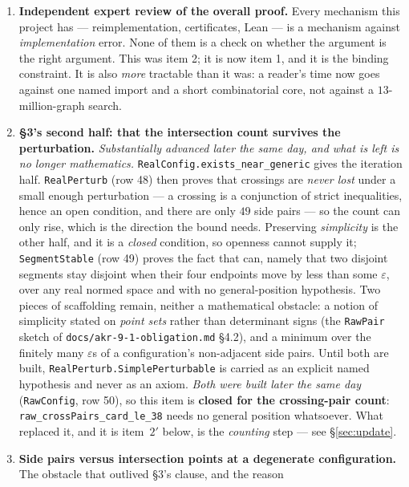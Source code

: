 \documentclass[11pt,a4paper]{article}
\theoremstyle{plain}
\theoremstyle{definition}
\theoremstyle{remark}
\begin{document}
\begin{enumerate}[leftmargin=*]
  \item \textbf{Independent expert review of the overall proof.} Every
    mechanism this project has --- reimplementation, certificates, Lean --- is a
    mechanism against \emph{implementation} error. None of them is a check on
    whether the argument is the right argument. This was item 2; it is now item
    1, and it is the binding constraint. It is also \emph{more} tractable than
    it was: a reader's time now goes against one named import and a short
    combinatorial core, not against a $13$-million-graph search.
  \item \textbf{\S3's second half: that the intersection count survives the
    perturbation.} \emph{Substantially advanced later the same day, and what is
    left is no longer mathematics.} \texttt{RealConfig.exists\_near\_generic}
    gives the iteration half. \texttt{RealPerturb} (row 48) then proves that
    crossings are \emph{never lost} under a small enough perturbation --- a
    crossing is a conjunction of strict inequalities, hence an open condition,
    and there are only $49$ side pairs --- so the count can only rise, which is
    the direction the bound needs. Preserving \emph{simplicity} is the other
    half, and it is a \emph{closed} condition, so openness cannot supply it;
    \texttt{SegmentStable} (row 49) proves the fact that can, namely that two
    disjoint segments stay disjoint when their four endpoints move by less than
    some $\varepsilon$, over any real normed space and with no general-position
    hypothesis. Two pieces of scaffolding remain, neither a mathematical
    obstacle: a notion of simplicity stated on \emph{point sets} rather than
    determinant signs (the \texttt{RawPair} sketch of
    \texttt{docs/akr-9-1-obligation.md} \S4.2), and a minimum over the finitely
    many $\varepsilon$s of a configuration's non-adjacent side pairs. Until both
    are built, \texttt{RealPerturb.SimplePerturbable} is carried as an explicit
    named hypothesis and never as an axiom. \emph{Both were built later the
    same day} (\texttt{RawConfig}, row 50), so this item is \textbf{closed for
    the crossing-pair count}: \texttt{raw\_crossPairs\_card\_le\_38} needs no
    general position whatsoever. What replaced it, and it is item~$2'$ below,
    is the \emph{counting} step --- see \S\ref{sec:update}.
  \item[$2'$.] \textbf{Side pairs versus intersection points at a degenerate
    configuration.} The obstacle that outlived \S3's clause, and the reason

\end{enumerate}
\end{document}
